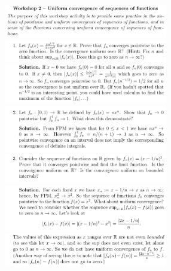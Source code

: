 \documentclass[8pt,landscape]{article}
\begin{document}
\raggedright{}
\begin{multicols}{3}
    \includegraphics[width=270]{001.png} \\
    \includegraphics[width=270]{002.png} \\
    \includegraphics[width=270]{003.png} \\
    \includegraphics[width=270]{004.png} \\
    \includegraphics[width=270]{005.png} \\
    \includegraphics[width=270]{006.png} \\
    \includegraphics[width=270]{007.png} \\

\end{multicols}
\end{document}
